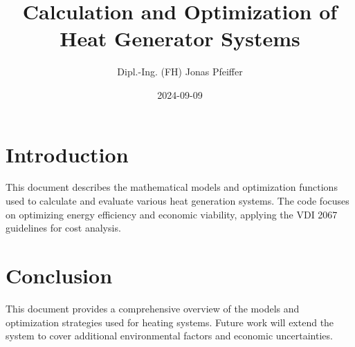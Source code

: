 \documentclass{article}
\title{Calculation and Optimization of Heat Generator Systems}
\author{Dipl.-Ing. (FH) Jonas Pfeiffer}
\date{2024-09-09}
\begin{document}
\maketitle

\section{Introduction}
This document describes the mathematical models and optimization functions used to calculate and evaluate various heat generation systems. The code focuses on optimizing energy efficiency and economic viability, applying the VDI 2067 guidelines for cost analysis.














\section{Conclusion}
This document provides a comprehensive overview of the models and optimization strategies used for heating systems. Future work will extend the system to cover additional environmental factors and economic uncertainties.
\end{document}
